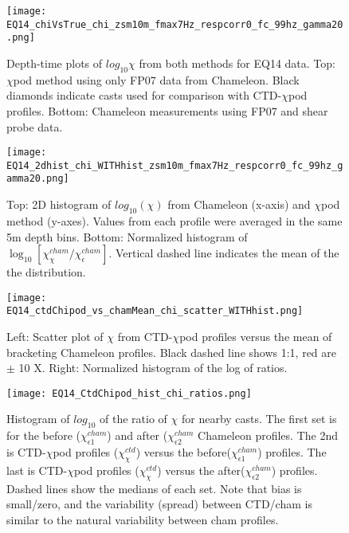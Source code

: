 \documentclass{ametsoc}
\begin{document}
\begin{figure}[t]
  \noindent\texttt{[image: EQ14\_chiVsTrue\_chi\_zsm10m\_fmax7Hz\_respcorr0\_fc\_99hz\_gamma20.png]}\\
  \caption{Depth-time plots of $log_{10}\chi$ from both methods for EQ14 data. Top: $\chi$pod method using only FP07 data from Chameleon. Black diamonds indicate casts used for comparison with CTD-$\chi$pod profiles. Bottom: Chameleon measurements using FP07 and shear probe data.}
  \label{eq14_eps_pcolor}
\end{figure}


\begin{figure}[t]
  \noindent\texttt{[image: EQ14\_2dhist\_chi\_WITHhist\_zsm10m\_fmax7Hz\_respcorr0\_fc\_99hz\_gamma20.png]}\\
  \caption{Top: 2D histogram of $log_{10}(\chi)$ from Chameleon (x-axis) and $\chi$pod method (y-axes). Values from each profile were averaged in the same 5m depth bins. Bottom: Normalized histogram of $\log_{10}[\chi_{\chi}^{cham}/\chi_{\epsilon}^{cham}]$. Vertical dashed line indicates the mean of the the distribution.}
  \label{eq14_chi_2dhist}
\end{figure}


\begin{figure}[t]
  \noindent\texttt{[image: EQ14\_ctdChipod\_vs\_chamMean\_chi\_scatter\_WITHhist.png]}\\
  \caption{Left: Scatter plot of $\chi$ from CTD-$\chi$pod profiles versus the mean of bracketing Chameleon profiles. Black dashed line shows 1:1, red are $\pm$ 10 X. Right: Normalized histogram of the log of ratios.}
  \label{eq14_cdtChi_vs_cham}
\end{figure}

\begin{figure}[t]
  \noindent\texttt{[image: EQ14\_CtdChipod\_hist\_chi\_ratios.png]}\\
  \caption{Histogram of $log_{10}$ of the ratio of $\chi$ for nearby casts. The first set is for the before ($\chi_{\epsilon1}^{cham}$) and after ($\chi_{\epsilon2}^{cham}$ Chameleon profiles. The 2nd is CTD-$\chi$pod profiles ($\chi_{\chi}^{ctd}$) versus the before($\chi_{\epsilon1}^{cham}$) profiles. The last is CTD-$\chi$pod profiles ($\chi_{\chi}^{ctd}$) versus the after($\chi_{\epsilon2}^{cham}$) profiles. Dashed lines show the medians of each set.  Note that bias is small/zero, and the variability (spread) between CTD/cham is similar to the natural variability between cham profiles.}
  \label{eq14_cdtChi_vs_cham_hist}
\end{figure}
\end{document}
